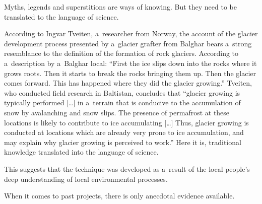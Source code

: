 Myths, legends and superstitions are ways of knowing. But they need to be translated to the language of science.

According to Ingvar Tveiten, a researcher from Norway, the account of the glacier development process presented
by a glacier grafter from Balghar bears a strong resemblance to the definition of the formation of rock
glaciers. According to a description by a Balghar local: “First the ice slips down into the rocks where it grows
roots. Then it starts to break the rocks bringing them up. Then the glacier comes forward. This has happened
where they did the glacier growing.” Tveiten, who conducted field research in Baltistan, concludes that “glacier
growing is typically performed […] in a terrain that is conducive to the accumulation of snow by avalanching and
snow slips. The presence of permafrost at these locations is likely to contribute to ice accumulating […] Thus,
glacier growing is conducted at locations which are already very prone to ice accumulation, and may explain why
glacier growing is perceived to work.” Here it is, traditional knowledge translated into the language of
science.

This suggests that the technique was developed as a result of the local
people’s deep understanding of local environmental processes.

When it comes to past projects, there is only anecdotal evidence available.
